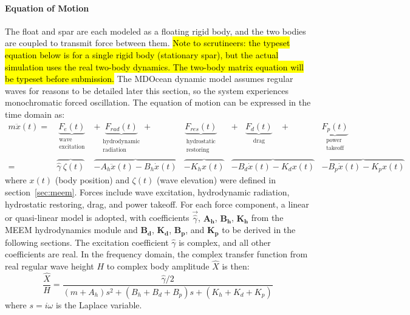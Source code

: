 \paragraph{Equation of Motion}
The float and spar are each modeled as a floating rigid body, and the two bodies are coupled to transmit force between them.
\hl{Note to scrutineers: the typeset equation below is for a single rigid body (stationary spar), but the actual simulation uses the real two-body dynamics.
The two-body matrix equation will be typeset before submission.} The MDOcean dynamic model assumes %
regular waves for reasons to be detailed later this section, so the system experiences monochromatic forced oscillation.
The equation of motion can be expressed in the time domain as: %
\setlength\arraycolsep{0pt}
\begin{equation}\label{eq:eom}
\begin{array}{rCCCCC}
     m\ddot{x}(t) = & \underbrace{F_{e}(t)}_{\substack{\textrm{wave} \\  \textrm{excitation} }} & +\underbrace{F_{rad}(t)}_{\substack{\text{hydrodynamic} \\ \text{radiation} }} +&  \underbrace{ F_{res}(t)}_{\substack{\textrm{hydrostatic} \\ \text{restoring} }} &  +~~~~\underbrace{F_{d}(t)}_{\substack{\textrm{drag} }}~~~~+ & \underbrace{F_{p}(t)}_{\substack{\textrm{power}\\\text{takeoff} }} \\
    = & \overbrace{\hat{\gamma}~ \zeta(t)} & \overbrace{-A_h\ddot{x}(t) - B_h\dot{x}(t)} &  \overbrace{-K_hx(t)} & \overbrace{-B_d\dot{x}(t)-K_dx(t)}  & \overbrace{-B_p\dot{x}(t)-K_px(t)}
\end{array}
\end{equation}
where $x(t)$ (body position) and $\zeta(t)$ (wave elevation) were defined in section~\ref{sec:meem}.
Forces include wave excitation, hydrodynamic radiation, hydrostatic restoring, drag, and power takeoff.
For each force component, a linear or quasi-linear model is adopted, with coefficients $\vec{\hat{\gamma}}$, $\mathbf{A_h}$, $\mathbf{B_h}$, $\mathbf{K_h}$ from the MEEM hydrodynamics module and $\mathbf{B_d}$, $\mathbf{K_d}$, $\mathbf{B_p}$, and $\mathbf{K_p}$ to be derived in the following sections.
The excitation coefficient $\hat{\gamma}$ is complex, and all other coefficients are real.
In the frequency domain, the complex transfer function from real regular wave height $H$ to complex body amplitude $\hat{X}$ is then:
\begin{equation}\label{eq:eom-freq-domain}
    \frac{\hat{X}}{H} = \frac{\hat{\gamma}/2}{(m+A_h)s^2+(B_h+B_d+B_p)s+(K_h+K_d+K_p)}
\end{equation}
where $s=i\omega$ is the Laplace variable.

